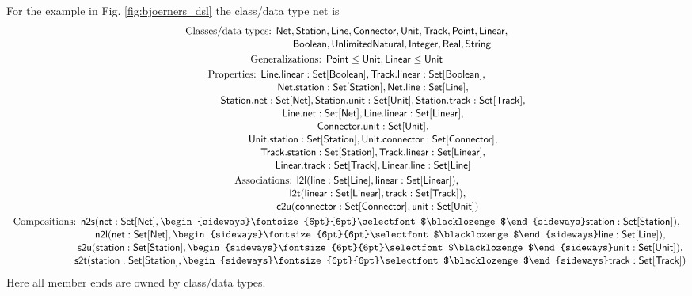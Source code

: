 \documentclass[10pt,fleqn,final]{scrreprt}
\newenvironment{definitions}[0]{\medskip }{}
\newcommand{\composition}{\raisebox{0.2pt}{\begin{sideways}\fontsize{6pt}{6pt}\selectfont$\blacklozenge$\end{sideways}}}
\begin{document}
\begin{definitions}
\medskip
 For the example in Fig. \ref{fig:bjoerners_dsl} the class/data type net is 
%
\begin{gather*}
  \text{Classes/data types: }\mathsf{Net}, \mathsf{Station}, \mathsf{Line}, \mathsf{Connector}, \mathsf{Unit}, \mathsf{Track}, \mathsf{Point}, \mathsf{Linear},
\\[-.5ex]
  \phantom{\text{Classes/data types: }}\mathsf{Boolean}, \mathsf{UnlimitedNatural}, \mathsf{Integer}, \mathsf{Real}, \mathsf{String}
\\
  \text{Generalizations: }\mathsf{Point} \leq \mathsf{Unit}, \mathsf{Linear} \leq \mathsf{Unit}
\\
  \text{Properties: }\mathsf{Line.linear : Set[Boolean]}, \mathsf{Track.linear : Set[Boolean]},
\\[-.5ex]
  \phantom{\text{Properties: }}\mathsf{Net.station : Set[Station]}, \mathsf{Net.line : Set[Line]},
\\[-.5ex]
  \phantom{\text{Properties: }}\mathsf{Station.net : Set[Net]}, \mathsf{Station.unit : Set[Unit]}, \mathsf{Station.track : Set[Track]},
\\[-.5ex]
  \phantom{\text{Properties: }}\mathsf{Line.net : Set[Net]}, \mathsf{Line.linear : Set[Linear]},
\\[-.5ex]
  \phantom{\text{Properties: }}\mathsf{Connector.unit : Set[Unit]},
\\[-.5ex]
  \phantom{\text{Properties: }}\mathsf{Unit.station : Set[Station]}, \mathsf{Unit.connector : Set[Connector]},
\\[-.5ex]
  \phantom{\text{Properties: }}\mathsf{Track.station : Set[Station]}, \mathsf{Track.linear : Set[Linear]},
\\[-.5ex]
  \phantom{\text{Properties: }}\mathsf{Linear.track : Set[Track]}, \mathsf{Linear.line : Set[Line]}
\\
  \text{Associations: }\mathsf{l2l(line : Set[Line], linear : Set[Linear])},
\\[-.5ex]
  \phantom{\text{Associations: }}\mathsf{l2t(linear : Set[Linear], track : Set[Track])},
\\[-.5ex]
  \phantom{\text{Associations: }}\mathsf{c2u(connector : Set[Connector], unit : Set[Unit])}
\\
  \text{Compositions: }\mathsf{n2s(net : Set[Net], \composition station : Set[Station])},
\\[-.5ex]
  \phantom{\text{Compositions: }}\mathsf{n2l(net : Set[Net], \composition line : Set[Line])},
\\[-.5ex]
  \phantom{\text{Compositions: }}\mathsf{s2u(station : Set[Station], \composition unit : Set[Unit])},
\\[-.5ex]
  \phantom{\text{Compositions: }}\mathsf{s2t(station : Set[Station], \composition track : Set[Track])}
\end{gather*}
%
Here all member ends are owned by class/data types.



\end{definitions}
\end{document}
